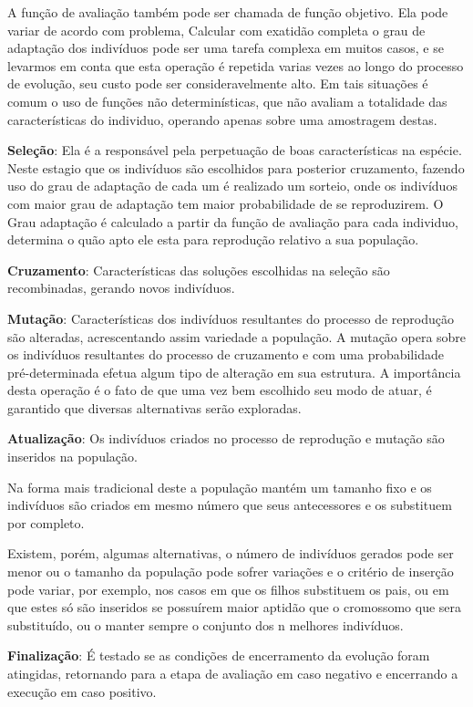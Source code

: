 A função de avaliação também pode ser chamada de função objetivo. Ela pode variar de acordo com problema,  
Calcular com exatidão completa o grau de adaptação dos indivíduos pode ser uma tarefa complexa em muitos casos, e se levarmos em conta que esta operação é repetida varias vezes ao longo do processo de evolução, seu custo pode ser consideravelmente alto. Em tais situações é comum o uso de funções não determinísticas, que não avaliam a totalidade das características do individuo, operando apenas sobre uma amostragem destas.

\textbf{Seleção}: Ela é a responsável pela perpetuação de boas características na espécie. 
Neste estagio que os indivíduos são escolhidos para posterior cruzamento, fazendo uso do grau de adaptação de cada um é realizado um sorteio, onde os indivíduos com maior grau de adaptação tem maior probabilidade de se reproduzirem.
O Grau adaptação é calculado a partir da função de avaliação para cada individuo, determina o quão apto ele esta para reprodução relativo a sua população. 

\textbf{Cruzamento}: Características das soluções escolhidas na seleção são recombinadas, gerando novos indivíduos.

\textbf{Mutação}: Características dos indivíduos resultantes do processo de reprodução são alteradas, acrescentando assim variedade a população.
A mutação opera sobre os indivíduos resultantes do processo de cruzamento e com uma probabilidade pré-determinada efetua algum tipo de alteração em sua  estrutura. A importância desta operação é o fato de que uma vez bem escolhido seu modo de atuar, é garantido que diversas alternativas serão exploradas.
 
\textbf{Atualização}: Os indivíduos criados no processo de reprodução e mutação são inseridos na população.

Na forma mais tradicional deste a população mantém um tamanho fixo e os indivíduos são criados em mesmo número que seus antecessores e os substituem por completo. 

Existem, porém, algumas alternativas, o número de indivíduos gerados pode ser menor ou o tamanho da população pode sofrer variações e o critério de inserção pode variar, por exemplo, nos casos em que os filhos substituem os pais, ou em que estes só são inseridos se possuírem maior aptidão que o cromossomo que sera substituído, ou o manter sempre o conjunto dos n melhores indivíduos. 

\textbf{Finalização}: É testado se as condições de encerramento da evolução foram atingidas, retornando para a etapa de avaliação em caso negativo e encerrando a execução em caso positivo.

